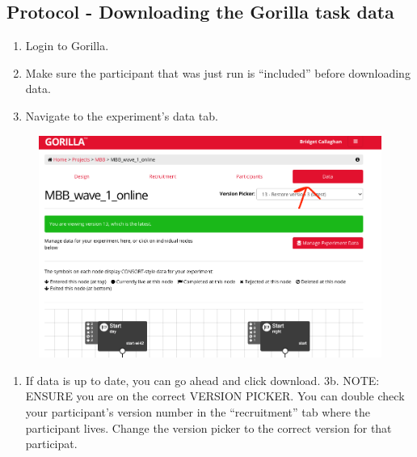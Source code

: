 \documentclass[]{book}
\providecommand{\tightlist}{%
  \setlength{\itemsep}{0pt}\setlength{\parskip}{0pt}}
\begin{document}
\hypertarget{protocol---downloading-the-gorilla-task-data}{%
\subsection{Protocol - Downloading the Gorilla task data}\label{protocol---downloading-the-gorilla-task-data}}

\begin{enumerate}
\def\labelenumi{\arabic{enumi}.}
\tightlist
\item
  Login to Gorilla.
\item
  Make sure the participant that was just run is ``included'' before downloading data.
\item
  Navigate to the experiment's data tab.
\end{enumerate}

\begin{figure}
\centering
\includegraphics{images/gorilla/6.png}
\caption{}
\end{figure}

\begin{enumerate}
\def\labelenumi{\arabic{enumi}.}
\setcounter{enumi}{2}
\tightlist
\item
  If data is up to date, you can go ahead and click download.
  3b. NOTE: ENSURE you are on the correct VERSION PICKER. You can double check your participant's version number in the ``recruitment'' tab where the participant lives. Change the version picker to the correct version for that participat.
\end{enumerate}
\end{document}

